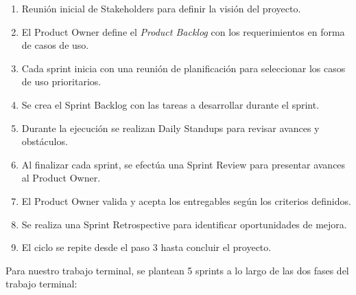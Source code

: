 \begin{enumerate}
\setlength{\itemsep}{0pt}
    \item Reunión inicial de Stakeholders para definir la visión del proyecto.
    \item El Product Owner define el \textit{Product Backlog} con los requerimientos en forma de casos de uso.
    \item Cada sprint inicia con una reunión de planificación para seleccionar los casos de uso prioritarios.
    \item Se crea el Sprint Backlog con las tareas a desarrollar durante el sprint.
    \item Durante la ejecución se realizan Daily Standups para revisar avances y obstáculos.
    \item Al finalizar cada sprint, se efectúa una Sprint Review para presentar avances al Product Owner.
    \item El Product Owner valida y acepta los entregables según los criterios definidos.
    \item Se realiza una Sprint Retrospective para identificar oportunidades de mejora.
    \item El ciclo se repite desde el paso 3 hasta concluir el proyecto.
\end{enumerate}

Para nuestro trabajo terminal, se plantean 5 sprints a lo largo de las dos fases del trabajo terminal:

